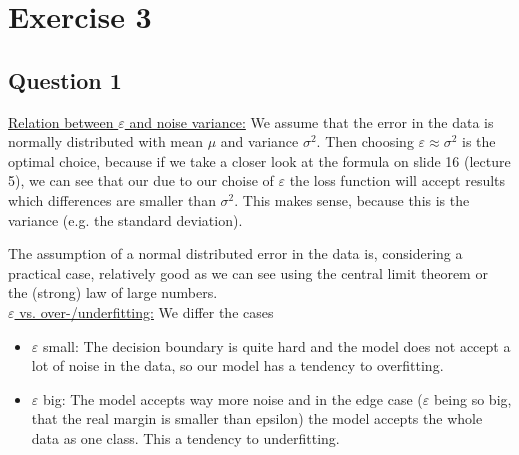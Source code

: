 \documentclass[a4paper, headsepline]{scrartcl}
\theoremstyle{plain}
\begin{document}
\section*{Exercise 3}
\subsection*{Question 1}
\underline{Relation between $\varepsilon$ and noise variance:} We assume that the error in the data is normally distributed with mean 
$\mu$ and variance $\sigma^2$. Then choosing $\varepsilon \approx \sigma^2$ is the optimal choice, because if we take a closer look
at the formula on slide 16 (lecture 5), we can see that our due to our choise of $\varepsilon$ the loss function will accept results
which differences are smaller than $\sigma^2$. This makes sense, because this is the variance (e.g. the standard deviation).

The assumption of a normal distributed error in the data is, considering a practical case, relatively good as we can see using the 
central limit theorem or the (strong) law of large numbers.\\
\underline{$\varepsilon$ vs. over-/underfitting:} We differ the cases
\begin{itemize}
\item $\varepsilon$ small: The decision boundary is quite hard and the model does not accept a lot of noise in the data, so our model
has a tendency to overfitting.
\item $\varepsilon$ big: The model accepts way more noise and in the edge case ($\varepsilon$ being so big, that the real margin is 
smaller than epsilon) the model accepts the whole data as one class. This a tendency to underfitting.
\end{itemize}
\end{document}
